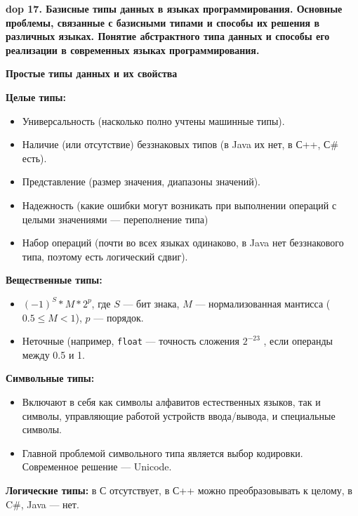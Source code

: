 \textbf{\LARGE dop 17. Базисные типы данных в языках программирования. Основные проблемы, связанные с базисными типами и способы их решения в различных языках. Понятие абстрактного типа данных и способы его реализации в современных языках программирования.}

\textbf{Простые типы данных и их свойства}

\textbf{Целые типы:}
\begin{itemize}
    \item Универсальность (насколько полно учтены машинные типы).
    \item Наличие (или отсутствие) беззнаковых типов (в Java их нет, в С++, С\# есть).
    \item Представление (размер значения, диапазоны значений).
    \item Надежность (какие ошибки могут возникать при выполнении операций с целыми значениями --- переполнение типа)
    \item Набор операций (почти во всех языках одинаково, в Java нет беззнакового типа, поэтому есть логический сдвиг).
\end{itemize}

\textbf{Вещественные типы:}
\begin{itemize}
    \item $(-1)^S \ast M \ast 2^p$, где $S$ --- бит знака, $M$ --- нормализованная мантисса ($0.5 \leq M < 1$), $p$ --- порядок.
    \item Неточные (например, \texttt{float} --- точность сложения $2^{-23}$ , если операнды между 0.5 и 1.
\end{itemize}

\textbf{Символьные типы:}
\begin{itemize}
    \item Включают в себя как символы алфавитов естественных языков, так и символы, управляющие работой устройств ввода/вывода, и специальные символы.
    \item Главной проблемой символьного типа является выбор кодировки.
    Современное решение --- Unicode.
\end{itemize}

\textbf{Логические типы:} в С отсутствует, в С++ можно преобразовывать к целому, в C\#, Java --- нет.

